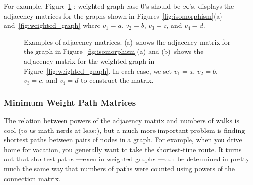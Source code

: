 \begin{editingnotes}
For example, Figure~\ref{fig:adjacency_matrix}
: weighted graph case 0's should be $\infty$'s.
displays the adjacency
matrices for the graphs shown in Figures~\ref{fig:isomorphism}(a)
and~\ref{fig:weighted_graph} where $v_1 = a$, $v_2 = b$, $v_3 = c$,
and $v_4 = d$.

\begin{figure}\redrawntrue
\normalbaselines
{}
\qquad
{}

\caption{Examples of adjacency matrices.  (a)~shows the adjacency
  matrix for the graph in Figure~\ref{fig:isomorphism}(a) and
  (b)~shows the adjacency matrix for the weighted graph in
  Figure~\ref{fig:weighted_graph}.  In each case, we  set $v_1
  = a$, $v_2 = b$, $v_3 = c$, and $v_4 = d$ to construct the matrix.}
\label{fig:adjacency_matrix}
\end{figure}

\subsubsection{Minimum Weight Path  Matrices}
The relation between powers of the adjacency matrix and numbers of
walks is cool (to us math nerds at least),
but a much more important
problem is finding  shortest paths between
pairs of nodes in a graph.  For example, when you drive home for vacation,
you generally want to take the shortest-time route.  It turns out that
shortest paths ---even in weighted graphs ---can be determined in pretty
much the same way that numbers of paths were counted using powers of the
connection matrix.


\end{editingnotes}
